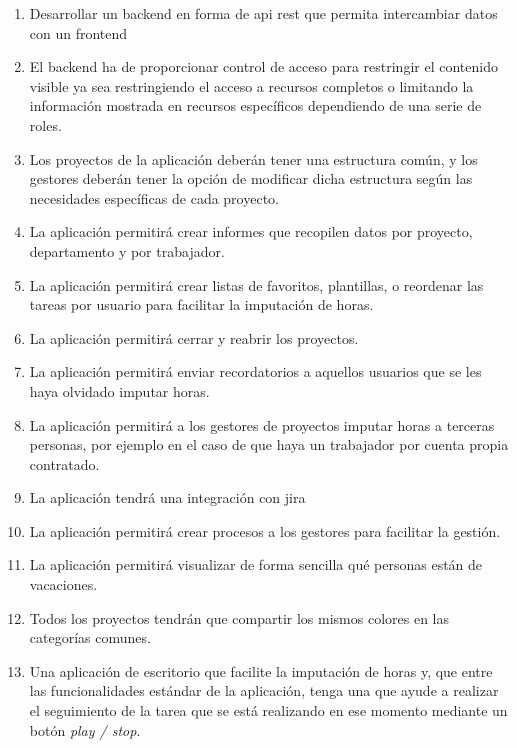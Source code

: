 \begin{enumerate}
 \item Desarrollar un \gls{backend} en forma de \gls{api} \gls{rest} que
 permita intercambiar datos con un \gls{frontend}

 \item El \gls{backend} ha de proporcionar control de acceso para restringir el
 contenido visible \textemdash ya sea restringiendo el acceso a recursos
 completos o limitando la información mostrada en recursos específicos
 \textemdash dependiendo de una serie de roles.

 \item Los proyectos de la aplicación deberán tener una estructura común, y
 los gestores deberán tener la opción de modificar dicha estructura según
 las necesidades específicas de cada proyecto.

 \item La aplicación permitirá crear informes que recopilen datos por proyecto,
 departamento y por trabajador.

 \item La aplicación permitirá crear listas de favoritos, plantillas, o
 reordenar las tareas por usuario para facilitar la imputación de horas.

 \item La aplicación permitirá cerrar y reabrir los proyectos.

 \item La aplicación permitirá enviar recordatorios a aquellos usuarios que
 se les haya olvidado imputar horas.

 \item La aplicación permitirá a los gestores de proyectos imputar horas a
 terceras personas, por ejemplo en el caso de que haya un trabajador por cuenta
 propia contratado.

 \item La aplicación tendrá una integración con \gls{jira}

 \item La aplicación permitirá crear procesos a los gestores para facilitar
 la gestión.

 \item La aplicación permitirá visualizar de forma sencilla qué personas
 están de vacaciones.

 \item Todos los proyectos tendrán que compartir los mismos colores en las
 categorías comunes.

 \item Una aplicación de escritorio que facilite la imputación de horas
 y, que entre las funcionalidades estándar de la aplicación, tenga una que
 ayude a realizar el seguimiento de la tarea que se está realizando en
 ese momento mediante un botón \textit{play / stop}.


\end{enumerate}

